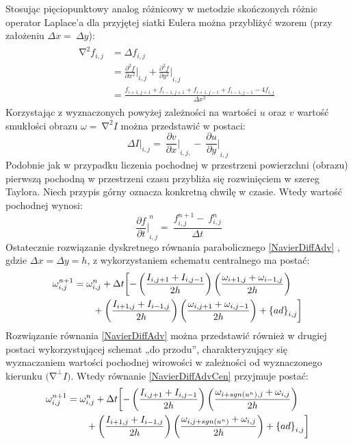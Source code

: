 \documentclass[12pt, twoside, openany]{report}
\theoremstyle{definition}
\begin{document}
Stosując pięciopunktowy analog różnicowy w metodzie skończonych różnic operator Laplace’a dla przyjętej siatki Eulera można przybliżyć wzorem (przy założeniu $\Delta x=\ \Delta y$):
\begin{align}
\begin{aligned}
{\mathrm{\nabla }}^2f_{i,j} &= \Delta f_{i,j} \\[1ex]
&={\frac{{\partial }^2f}{\partial x^2}|}_{i,j}+{\frac{{\partial }^2f}{\partial y^2}|}_{i,j} \\
&=\frac{f_{i+1,j+1}+f_{i-1,j+1}+f_{i+1,j-1}+f_{i-1,j-1}-4f_{i,j}}{\Delta x^2}\ 
\end{aligned}
\label{LaplaceOpr}
\end{align}
Korzystając z wyznaczonych powyżej zależności na wartości $u$ oraz $v$ wartość smukłości obrazu $\omega =\ {\mathrm{\nabla }}^2I$ można przedstawić w postaci: 
\begin{equation}
\Delta {I|}_{i,j}=\ {\frac{\partial v}{\partial x}|}_{i,j,}-\ {\frac{\partial u}{\partial y}|}_{i,j}
\label{discreteVorticity}
\end{equation}
Podobnie jak w przypadku liczenia pochodnej w przestrzeni powierzchni (obrazu) pierwszą pochodną w przestrzeni czasu przybliża się rozwinięciem w szereg Taylora. Niech przypis górny oznacza konkretną chwilę w czasie. Wtedy wartość pochodnej wynosi:
\begin{equation}
\ {{\frac{\partial f}{\partial t}|}^n_{i,j}=\ \frac{f^{n+1}_{i,j}-\ f^n_{i,j}}{\Delta t}}
\label{dfdt}
\end{equation}
Ostatecznie rozwiązanie dyskretnego równania parabolicznego \eqref{NavierDiffAdv} , gdzie $\Delta x= \Delta y=h$, z wykorzystaniem schematu centralnego ma postać:
\begin{align}
{\omega }^{n+1}_{i,j} &= {\omega }^n_{i,j}+\Delta t\biggl[
-\left(\frac{I_{i,j+1}+I_{i,j-1}}{2h}\right)\left(\frac{{\omega }_{i+1,j}
+{\omega }_{i-1,j}}{2h}\right)  \notag\\ 
&\qquad+ \left(\frac{I_{i+1,j}+I_{i-1,j}}{2h}\right)\left(\frac{{\omega }_{i,j+1}+{\omega }_{i,j-1}}{2h}\right)+{\left\{ad\right\}}_{i,j} \biggr]
\label{NavierDiffAdvCen}
\end{align}
Rozwiązanie równania \eqref{NavierDiffAdv} można przedstawić również w drugiej postaci wykorzystującej schemat „do przodu”, charakteryzujący się wyznaczaniem wartości pochodnej wirowości w zależności od wyznaczonego kierunku ${\mathrm{(}\mathrm{\nabla }}^{\bot }I)$.  Wtedy równanie \eqref{NavierDiffAdvCen} przyjmuje postać:
\begin{align}
{\omega }^{n+1}_{i,j} &= {\omega }^n_{i,j}+\Delta t\biggl[
-\left(\frac{I_{i,j+1}+I_{i,j-1}}{2h}\right)\left(\frac{{\omega }_{i+sgn\left(u^n\right),j}+{\omega }_{i,j}}{2h}\right)  \notag\\ 
&\qquad+ \left(\frac{I_{i+1,j}+I_{i-1,j}}{2h}\right)\left(\frac{{\omega }_{i,j+sgn(u^n)}+{\omega }_{i,j}}{2h}\right)+{\left\{ad\right\}}_{i,j} \biggr]
\label{NavierDiffAdvFor}
\end{align}
\end{document}
